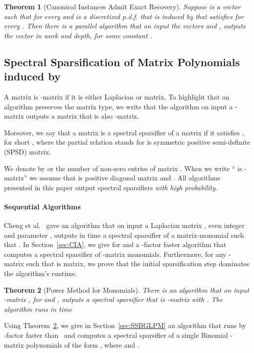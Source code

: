 \documentclass[11pt]{article}
\newtheorem{thm}{Theorem}  \newtheorem{fact}[thm]{Fact}
\numberwithin{thm}{section}
\begin{document}
\begin{thm}[Canonical Instances Admit Exact Recovery]\label{thm_my_Inv_Bnp}
Suppose  is a vector
such that  for every  and  is a discretized p.d.f. that is induced by  
that satisfies 
for every . Then there is a parallel algorithm that
on input the vectors  and , outputs the vector  in  work and  depth, for some constant .
\end{thm}


\subsection{Spectral Sparsification of Matrix Polynomials induced by }\label{subsec:SSMP}

A matrix  is -matrix if it is either Laplacian or  matrix. To highlight that an algorithm  preserves the matrix type, we write that the algorithm  on input a -matrix  outputs a matrix  that is also -matrix.

Moreover, we say that a matrix  is a spectral sparsifier of a matrix  if it
satisfies , for short ,
where the partial relation  stands for  is symmetric
positive semi-definite (SPSD) matrix.

We denote by  or  the number of non-zero entries of matrix . When we write `` is -matrix'' we assume that  is positive diagonal matrix and . All algorithms presented in this paper output spectral sparsifiers \emph{with high probability}.

\paragraph{Sequential Algorithms}
Cheng et al.~\cite[Theorem 1.5]{arxivCCLPT15} gave an algorithm that on input a Laplacian matrix , even integer  and parameter , outputs in time  a spectral sparsifier  of a matrix-monomial such that . In Section~\ref{sec:CIA}, we give for  and  a -factor faster algorithm that computes a spectral sparsifier of -matrix monomials. Furthermore, for any -matrix  such that  is  matrix, we prove that the initial sparsification step dominates the algorithm's runtime.

\begin{thm}[Power Method for Monomials]\label{thmMyGLN}
There is an algorithm  that on input -matrix ,  for  and , outputs a spectral sparsifier
 that is -matrix with .
The algorithm runs in time

\end{thm}

Using Theorem~\ref{thmMyGLN}, we give in Section~\ref{sec:SSBGLPM} an algorithm
that runs by -factor faster than~\cite[Theorem 2]{CCLPT15} and computes a spectral sparsifier of a single Binomial -matrix polynomials of the form , where  and .
\end{document}
